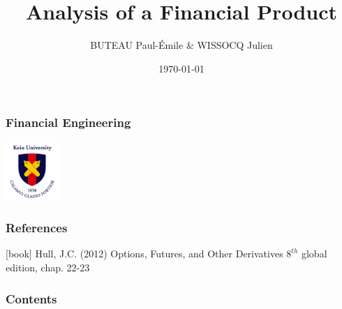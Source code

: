 \documentclass[t]{beamer}
\title{Analysis of a Financial Product}
\author{BUTEAU Paul-\'Emile \& WISSOCQ Julien }
\date{\today}
\begin{document}

\begin{frame}[c]
\frametitle{Financial Engineering}
\centering
\includegraphics[width=0.15\textwidth]{Keio}
\titlepage
\end{frame}

\begin{frame}[c]
\frametitle{References}
\footnotesize{
\begin{thebibliography}{9}


[book]
 Hull, J.C. (2012)
	\newblock Options, Futures, and Other Derivatives
	\newblock $8^{th}$ global edition, chap. 22-23

\end{thebibliography}
}
\end{frame}

\begin{frame}[c]
\frametitle{Contents}
\tableofcontents
\end{frame}


%
%
%
%
%
\end{document}
